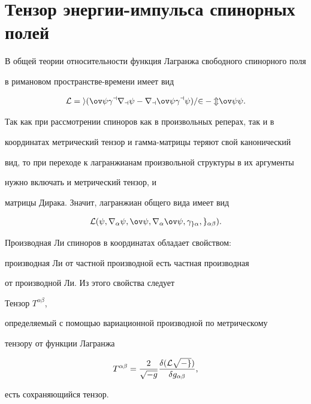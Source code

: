 \section{Тензор энергии-импульса спинорных полей}





В общей теории относительности функция Лагранжа свободного спинорного поля


в римановом пространстве-времени имеет вид


$$


\cal L=i(\ov \psi\gamma^a\nabla_a\psi-\nabla_a\ov \psi\gamma^a\psi)/2-m


\ov \psi \psi.


$$


Так как при рассмотрении спиноров как в произвольных реперах, так и в 


координатах метрический тензор и гамма-матрицы теряют свой канонический 


вид, то при переходе к лагранжианам произвольной структуры в их аргументы 


нужно включать и метрический тензор, и 


матрицы Дирака. Значит, лагранжиан общего вида имеет вид


$$


\cal L(\psi,\nabla_\alpha\psi,\ov\psi,\nabla_\alpha\ov \psi,\gamma_{g\alpha},


g_{\alpha\beta}).


$$


 


Производная Ли спиноров в координатах обладает свойством:


производная Ли от частной производной есть частная производная


от производной Ли. Из этого свойства следует





\begin{lem}


Тензор $ T^{\alpha\beta}$, 


определяемый с помощью вариационной производной по метрическому


тензору от функции Лагранжа


$$


T^{\alpha\beta}=\frac{2}{\sqrt{-g}}


\frac{\delta( \cal L\sqrt{-g})}{\delta g_{\alpha\beta}},


$$


есть сохраняющийся тензор.


\end{lem}





